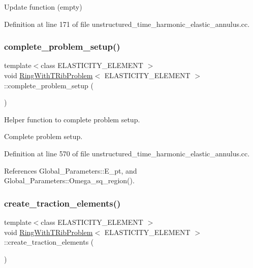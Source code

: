 Update function (empty) 



Definition at line 171 of file unstructured\+\_\+time\+\_\+harmonic\+\_\+elastic\+\_\+annulus.\+cc.

\mbox{\label{classRingWithTRibProblem_a7aa8c978ec6ff0a9823ef895b263fb41}} 
\subsubsection{\texorpdfstring{complete\+\_\+problem\+\_\+setup()}{complete\_problem\_setup()}}
{\footnotesize\ttfamily template$<$class E\+L\+A\+S\+T\+I\+C\+I\+T\+Y\+\_\+\+E\+L\+E\+M\+E\+NT $>$ \\
void \hyperlink{classRingWithTRibProblem}{Ring\+With\+T\+Rib\+Problem}$<$ E\+L\+A\+S\+T\+I\+C\+I\+T\+Y\+\_\+\+E\+L\+E\+M\+E\+NT $>$\+::complete\+\_\+problem\+\_\+setup (\begin{DoxyParamCaption}{ }\end{DoxyParamCaption})\hspace{0.3cm}{\ttfamily [private]}}



Helper function to complete problem setup. 

Complete problem setup. 

Definition at line 570 of file unstructured\+\_\+time\+\_\+harmonic\+\_\+elastic\+\_\+annulus.\+cc.



References Global\+\_\+\+Parameters\+::\+E\+\_\+pt, and Global\+\_\+\+Parameters\+::\+Omega\+\_\+sq\+\_\+region().

\mbox{\label{classRingWithTRibProblem_ac4445c7a9fbfdcb69063d36fe0fe08c3}} 
\subsubsection{\texorpdfstring{create\+\_\+traction\+\_\+elements()}{create\_traction\_elements()}}
{\footnotesize\ttfamily template$<$class E\+L\+A\+S\+T\+I\+C\+I\+T\+Y\+\_\+\+E\+L\+E\+M\+E\+NT $>$ \\
void \hyperlink{classRingWithTRibProblem}{Ring\+With\+T\+Rib\+Problem}$<$ E\+L\+A\+S\+T\+I\+C\+I\+T\+Y\+\_\+\+E\+L\+E\+M\+E\+NT $>$\+::create\+\_\+traction\+\_\+elements (\begin{DoxyParamCaption}{ }\end{DoxyParamCaption})\hspace{0.3cm}{\ttfamily [private]}}



